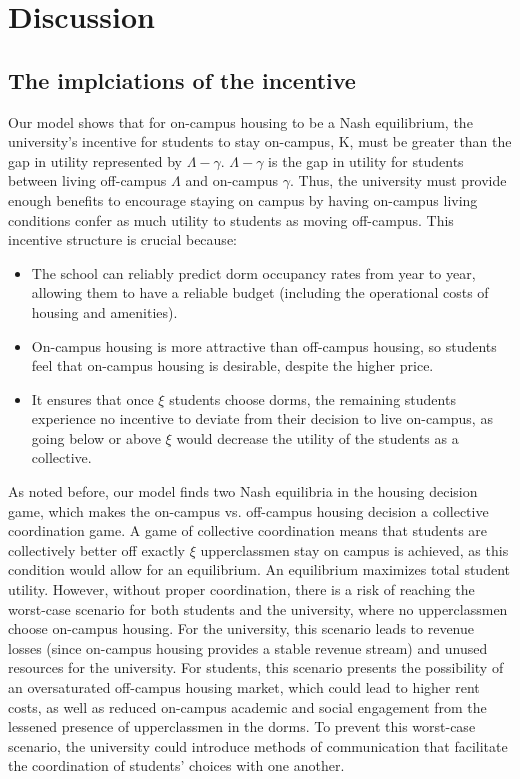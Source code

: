 \documentclass[12pt]{article}
\begin{document}
\section{Discussion}
\subsection{The implciations of the incentive}
Our model shows that for on-campus housing to be a Nash equilibrium, the university’s incentive for students to stay on-campus, K, must be greater than the gap in utility represented by  $\Lambda - \gamma$. $\Lambda - \gamma$ is the gap in utility for students between living off-campus $\Lambda$ and on-campus $\gamma$. Thus, the university must provide enough benefits to encourage staying on campus by having on-campus living conditions confer as much utility to students as moving off-campus. This incentive structure is crucial because:
\begin{itemize}
    \item The school can reliably predict dorm occupancy rates from year to year, allowing them to have a reliable budget (including the operational costs of housing and amenities).
    \item On-campus housing is more attractive than off-campus housing, so students feel that on-campus housing is desirable, despite the higher price.
    \item It ensures that once $\xi$ students choose dorms, the remaining students experience no incentive to deviate from their decision to live on-campus, as going below or above $\xi$ would decrease the utility of the students as a collective.
\end{itemize}
As noted before, our model finds two Nash equilibria in the housing decision game, which makes the on-campus vs. off-campus housing decision a collective coordination game. A game of collective coordination means that students are collectively better off exactly $\xi$ upperclassmen stay on campus is achieved, as this condition would allow for an equilibrium. An equilibrium maximizes total student utility. However, without proper coordination, there is a risk of reaching the worst-case scenario for both students and the university, where no upperclassmen choose on-campus housing. For the university, this scenario leads to revenue losses (since on-campus housing provides a stable revenue stream) and unused resources for the university. For students, this scenario presents the possibility of an oversaturated off-campus housing market, which could lead to higher rent costs, as well as reduced on-campus academic and social engagement from the lessened presence of upperclassmen in the dorms. To prevent this worst-case scenario, the university could introduce methods of communication that facilitate the coordination of students’ choices with one another.
\end{document}
